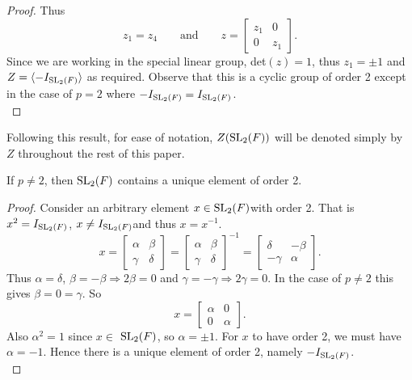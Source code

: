 \begin{proof}
Thus 
\begin{equation*} 
    z_1 = z_4 \qquad  \text{and} \qquad z =  
    \begin{bmatrix} z_1 & 0 \\ 0 & z_1 \end{bmatrix}. 
\end{equation*}
Since we are working in the special linear group, det$(z)=1$, thus $z_1 = \pm 1$ and $Z = \langle - I_{\operatorname{SL}_2(F)}\rangle$ as required. Observe that this is a cyclic group of order 2 except in the case of $p = 2$ where $- I_{\operatorname{SL}_2(F)} = I_{\operatorname{SL}_2(F)}$. \\
\end{proof}

Following this result, for ease of notation, $Z(\operatorname{SL}_2(F))$ will be denoted simply by $Z$ throughout the rest of this paper.

\begin{lemma}
\label{SpecialSubgroups.exists_unique_orderOf_eq_two}
\leanok
    If $p\neq 2$, then $\operatorname{SL}_2(F)$ contains a unique element of order 2. \\
\end{lemma}

\begin{proof} 
Consider an arbitrary element $x \in \operatorname{SL}_2(F)$with order 2. That is $x^2 = I_{\operatorname{SL}_2(F)}$, $x \neq I_{\operatorname{SL}_2(F)}$and thus $x=x^{-1}$.
\begin{equation*} 
    x = \begin{bmatrix} \alpha & \beta \\ \gamma & \delta \end{bmatrix} = \begin{bmatrix} \alpha & \beta \\ \gamma & \delta \end{bmatrix}^{-1} = \begin{bmatrix} \delta & - \beta \\ - \gamma & \alpha \end{bmatrix}.
\end{equation*}
\noindent Thus $\alpha = \delta$, $\beta = - \beta \Rightarrow 2\beta = 0$ and $\gamma = - \gamma \Rightarrow 2\gamma = 0$. In the case of $p \neq 2$ this gives $\beta = 0 = \gamma$. So
\begin{equation*} 
    x = \begin{bmatrix} \alpha & 0 \\ 0 & \alpha \end{bmatrix}.
\end{equation*}
\noindent Also $\alpha^2 = 1$ since $x \in$ $\operatorname{SL}_2(F)$, so $\alpha = \pm 1$. For $x$ to have order 2, we must have $\alpha = - 1$. Hence there is a unique element of order 2, namely $- I_{\operatorname{SL}_2(F)}$.
\\
\end{proof}

